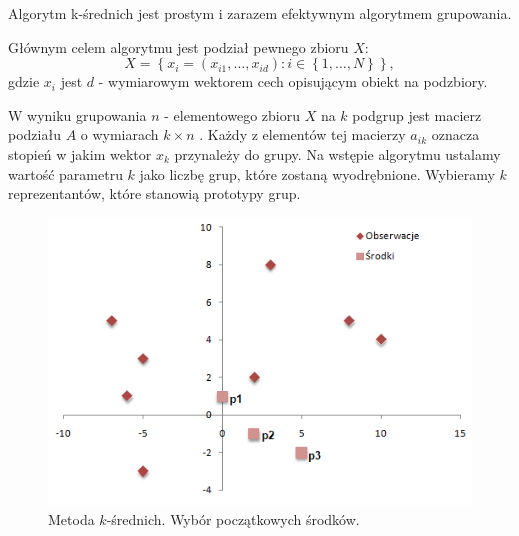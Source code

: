 \documentclass[12pt,a4paper]{report}
\newcommand{\set}[1]{\left\lbrace {#1} \right\rbrace}
\begin{document}
Algorytm k-średnich jest prostym i zarazem efektywnym algorytmem grupowania.

Głównym celem algorytmu jest podział pewnego zbioru $X$:
$$
X = \set{x_i = (x_{i1},\ldots,x_{id}) : i \in \set{1,\ldots,N}},
$$
gdzie $x_i$ jest $d$ - wymiarowym wektorem cech opisującym obiekt na podzbiory.

W wyniku grupowania $n$ - elementowego zbioru $X$ na $k$ podgrup jest macierz podziału $A$ o wymiarach $k\times n$ . Każdy z elementów tej macierzy $a_{ik}$ oznacza stopień w jakim wektor $x_k$ przynależy do grupy. Na wstępie algorytmu ustalamy wartość parametru $k$ jako liczbę grup, które zostaną wyodrębnione. Wybieramy $k$ reprezentantów, które stanowią prototypy grup.
\begin{center}
\begin{figure}[H]
\centering
\includegraphics[scale=0.8]{ks_0.PNG} 
\caption{Metoda $k$-średnich. Wybór początkowych środków.}
\end{figure}
\end{center}
\end{document}
